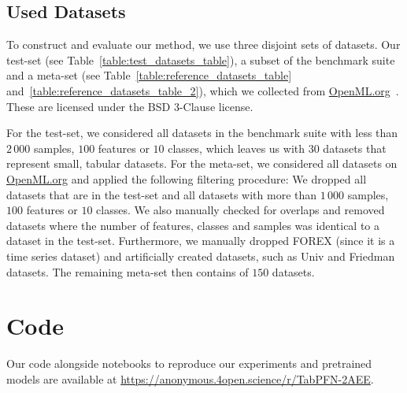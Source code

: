 \documentclass{article}
\begin{document}
\subsection{Used Datasets}\label{app:ssec:datasets}

To construct and evaluate our method, we use three disjoint sets of datasets. Our test-set (see Table~\ref{table:test_datasets_table}), a subset of the \openmlcc{} benchmark suite~\citep{bischl-neuripsdbt21a} and a meta-set (see Table~\ref{table:reference_datasets_table} and~\ref{table:reference_datasets_table_2}), which we collected from \url{OpenML.org}~\citep{vanschoren-sigkdd14a}. These are licensed under the BSD 3-Clause license.

For the test-set, we considered all datasets in the \openmlcc{} benchmark suite with less than $2\,000$ samples, $100$ features or $10$ classes, which leaves us with $30$ datasets that represent small, tabular datasets.
%
For the meta-set, we considered all datasets on \url{OpenML.org} and applied the following filtering procedure: We dropped all datasets that are in the test-set and all datasets with more than $1\,000$ samples, $100$ features or $10$ classes. We also manually checked for overlaps and removed datasets where the number of features, classes and samples was identical to a dataset in the test-set. Furthermore, we manually dropped FOREX (since it is a time series dataset) and artificially created datasets, such as Univ and Friedman datasets. The remaining meta-set then contains of $150$ datasets.

\section{Code}\label{app:code}

Our code alongside notebooks to reproduce our experiments and pretrained models are available at \url{https://anonymous.4open.science/r/TabPFN-2AEE}.
\end{document}
